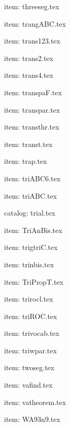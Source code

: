 
\medskip
item: threeseg.tex

\medskip
item: trangABC.tex

\medskip
item: trans123.tex

\medskip
item: trans2.tex

\medskip
item: trans4.tex

\medskip
item: transpaF.tex

\medskip
item: transpar.tex

\medskip
item: transthr.tex

\medskip
item: transt.tex

\medskip
item: trap.tex

\medskip
item: triABC6.tex

\medskip
item: triABC.tex

\medskip
catalog: trial.tex \par
item: TriAnBis.tex

\medskip
item: trigtriC.tex

\medskip
item: trinbis.tex

\medskip
item: TriPropT.tex

\medskip
item: trirocl.tex

\medskip
item: triROC.tex

\medskip
item: trivocab.tex

\medskip
item: triwpar.tex

\medskip
item: twoseg.tex

\medskip
item: vafind.tex

\medskip
item: vatheorem.tex

\medskip
item: WA93n9.tex

\medskip
\bye
